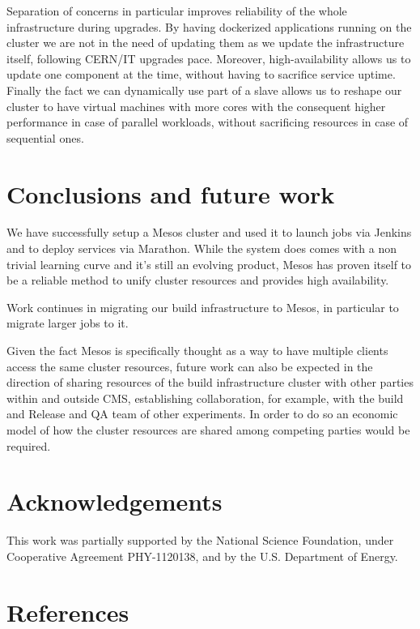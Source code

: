 \documentclass[a4paper]{jpconf}
\begin{document}
Separation of concerns in particular improves reliability of the whole
infrastructure during upgrades. By having dockerized applications running on the
cluster we are not in the need of updating them as we update the infrastructure
itself, following CERN/IT upgrades pace. Moreover, high-availability allows us
to update one component at the time, without having to sacrifice service uptime.
Finally the fact we can dynamically use part of a slave allows us to reshape our
cluster to have virtual machines with more cores with the consequent higher
performance in case of parallel workloads, without sacrificing resources in case
of sequential ones.

\section{Conclusions and future work}

We have successfully setup a Mesos cluster and used it to launch jobs via
Jenkins and to deploy services via Marathon. While the system does comes with a
non trivial learning curve and it's still an evolving product, Mesos has proven
 itself to be a reliable method to unify cluster resources and provides high
availability.

Work continues in migrating our build infrastructure to Mesos, in particular
to migrate larger jobs to it.

Given the fact Mesos is specifically thought as a way to have multiple clients
access the same cluster resources, future work can also be expected in the
direction of sharing resources of the build infrastructure cluster with other
parties within and outside CMS, establishing collaboration, for example, with
the build and Release and QA team of other experiments. In order to do so an
economic model of how the cluster resources are shared among competing parties
would be required.

\section*{Acknowledgements}
This work was partially supported by the National Science Foundation, under
Cooperative Agreement PHY-1120138, and by the U.S. Department of Energy.

\section*{References}


\end{document}
